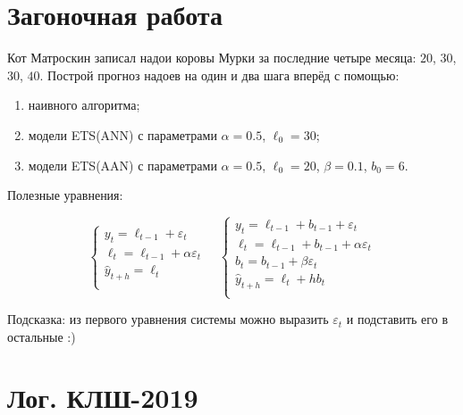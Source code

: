 \documentclass[12pt]{article}
\theoremstyle{definition}
\begin{document}
\section{Загоночная работа}

Кот Матроскин записал надои коровы Мурки за последние четыре месяца: $20$, $30$, $30$, $40$. 
Построй прогноз надоев на один и два шага вперёд с помощью:

\begin{enumerate}
    \item наивного алгоритма;
    \item модели ETS(ANN) с параметрами $\alpha = 0.5$, $\ell_0 = 30$;
    \item модели ETS(AAN) с параметрами $\alpha = 0.5$, $\ell_0 = 20$, $\beta = 0.1$, $b_0 = 6$.
\end{enumerate}


Полезные уравнения:

\[
\begin{cases}
y_t = \ell_{t-1} + \varepsilon_t \\
\ell_t = \ell_{t-1} + \alpha \varepsilon_t \\
\hat y_{t+h} = \ell_t \\
\end{cases} \quad
\begin{cases}
y_t = \ell_{t-1} + b_{t-1} + \varepsilon_t \\
\ell_t = \ell_{t-1} + b_{t-1} + \alpha \varepsilon_t \\
b_t = b_{t-1} + \beta \varepsilon_t \\
\hat y_{t+h} = \ell_t + h b_t \\
\end{cases}    
\]

Подсказка: из первого уравнения системы можно выразить $\varepsilon_t$ и подставить его в остальные :)




\newpage

\section{Лог. КЛШ-2019}
\end{document}
